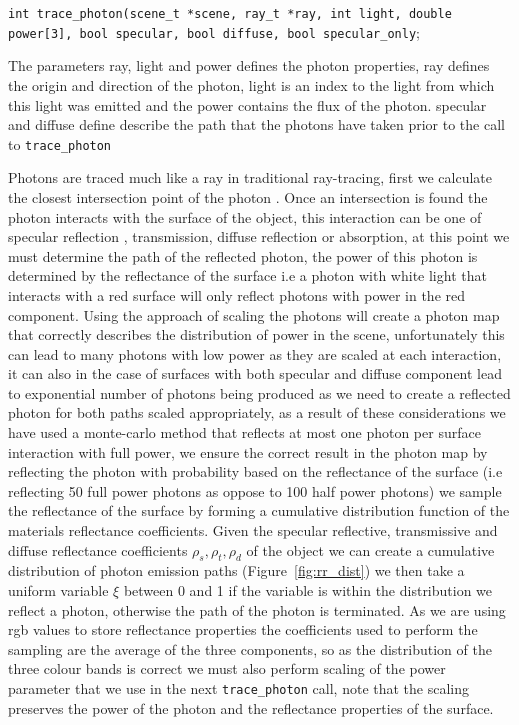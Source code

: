 \texttt{int trace\_photon(scene\_t *scene, ray\_t *ray, int light, double power[3], bool specular, bool diffuse, bool specular\_only};

The parameters ray, light and power defines the photon properties, ray defines the origin and direction of the photon, light is an index
to the light from which this light was emitted and the power contains the flux of the photon. specular and diffuse
define describe the path that the photons have taken prior to the call to \texttt{trace\_photon}

Photons are traced much like a ray in traditional ray-tracing, first we calculate the closest intersection point of the photon
. Once an intersection is found the photon interacts with the surface of the object, this interaction can be one of
specular reflection , transmission, diffuse reflection or absorption, at this point we must determine the path of the reflected
photon, the power of this photon is determined by the reflectance of the surface i.e a photon with white light that interacts with
a red surface will only reflect photons with power in the red component. Using the approach of scaling the photons will create a photon
map that correctly describes the distribution of power in the scene, unfortunately this can lead to many photons with low power as they
are scaled at each interaction, it can also in the case of surfaces with both specular and diffuse component lead to exponential number
of photons being produced as we need to create a reflected photon for both paths scaled appropriately, as a result of these considerations
we have used a monte-carlo method that reflects at most one photon
per surface interaction with full power, we ensure the correct result in the photon map by reflecting the photon
with probability based on the reflectance of the surface (i.e reflecting 50 full power photons as oppose to 100 half power photons)
we sample the reflectance of the surface by forming a cumulative distribution function of the materials reflectance coefficients.
Given the specular reflective, transmissive and diffuse reflectance coefficients $\rho_{s}, \rho_{t}, \rho_{d}$
of the object we can create a cumulative distribution of photon emission paths (Figure~\ref{fig:rr_dist}) 
we then take a uniform variable $\xi$ between 0 and 1 if the variable is within the distribution we reflect a photon, otherwise
the path of the photon is terminated. As we are using rgb values to store reflectance properties the
coefficients used to perform the sampling are the average of the three components, so as the distribution of the three
colour bands is correct we must also perform scaling of the power parameter that we use in the next \texttt{trace\_photon}
call, note that the scaling preserves the power of the photon and the reflectance properties of the surface.

